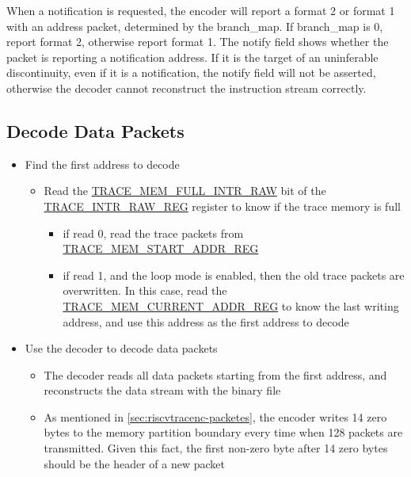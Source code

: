 \documentclass[main\_\_EN.tex]{subfiles}
\begin{document}
When a notification is requested, the encoder will report a format 2 or format 1 with an address packet, determined by the branch\_map. If branch\_map is 0, report format 2, otherwise report format 1. The notify field shows whether the packet is reporting a notification address. If it is the target of an uninferable discontinuity, even if it is a notification, the notify field will not be asserted, otherwise the decoder cannot reconstruct the instruction stream correctly.


\subsection{Decode Data Packets}

\begin{itemize}
    \item Find the first address to decode
        \begin{itemize}
            \item Read the \hyperref[fielddesc:TRACEMEMFULLINTRRAW]{TRACE\_MEM\_FULL\_INTR\_RAW} bit of the \hyperref[regdesc:TRACEINTRRAWREG]{TRACE\_INTR\_RAW\_REG} register to know if the trace memory is full
            \begin{itemize}
                \item if read 0, read the trace packets from \hyperref[regdesc:TRACEMEMSTARTADDRREG]{TRACE\_MEM\_START\_ADDR\_REG}
                \item if read 1, and the loop mode is enabled, then the old trace packets are overwritten. In this case, read the \hyperref[regdesc:TRACEMEMCURRENTADDRREG]{TRACE\_MEM\_CURRENT\_ADDR\_REG} to know the last writing address, and use this address as the first address to decode
            \end{itemize}
        \end{itemize}

    \item Use the decoder to decode data packets
        \begin{itemize}
            \item The decoder reads all data packets starting from the first address, and reconstructs the data stream with the binary file
            \item As mentioned in \ref{sec:riscvtracenc-packetes}, the encoder writes 14 zero bytes to the memory partition boundary every time when 128 packets are transmitted. Given this fact, the first non-zero byte after 14 zero bytes should be the header of a new packet
        \end{itemize}
\end{itemize}
\end{document}
